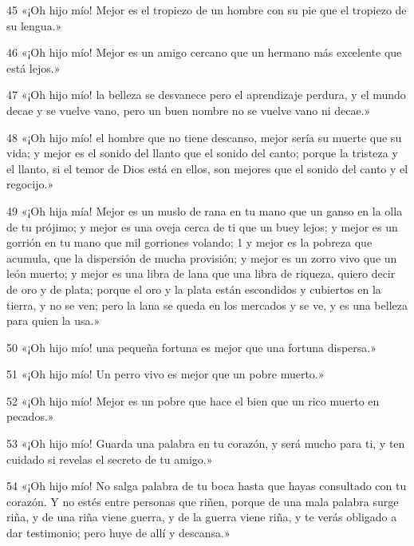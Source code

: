 \par 45 «¡Oh hijo mío! Mejor es el tropiezo de un hombre con su pie que el tropiezo de su lengua.»

\par 46 «¡Oh hijo mío! Mejor es un amigo cercano que un hermano más excelente que está lejos.»

\par 47 «¡Oh hijo mío! la belleza se desvanece pero el aprendizaje perdura, y el mundo decae y se vuelve vano, pero un buen nombre no se vuelve vano ni decae.»

\par 48 «¡Oh hijo mío! el hombre que no tiene descanso, mejor sería su muerte que su vida; y mejor es el sonido del llanto que el sonido del canto; porque la tristeza y el llanto, si el temor de Dios está en ellos, son mejores que el sonido del canto y el regocijo.»

\par 49 «¡Oh hija mía! Mejor es un muslo de rana en tu mano que un ganso en la olla de tu prójimo; y mejor es una oveja cerca de ti que un buey lejos; y mejor es un gorrión en tu mano que mil gorriones volando; 1 y mejor es la pobreza que acumula, que la dispersión de mucha provisión; y mejor es un zorro vivo que un león muerto; y mejor es una libra de lana que una libra de riqueza, quiero decir de oro y de plata; porque el oro y la plata están escondidos y cubiertos en la tierra, y no se ven; pero la lana se queda en los mercados y se ve, y es una belleza para quien la usa.»

\par 50 «¡Oh hijo mío! una pequeña fortuna es mejor que una fortuna dispersa.»

\par 51 «¡Oh hijo mío! Un perro vivo es mejor que un pobre muerto.»

\par 52 «¡Oh hijo mío! Mejor es un pobre que hace el bien que un rico muerto en pecados.»

\par 53 «¡Oh hijo mío! Guarda una palabra en tu corazón, y será mucho para ti, y ten cuidado si revelas el secreto de tu amigo.»

\par 54 «¡Oh hijo mío! No salga palabra de tu boca hasta que hayas consultado con tu corazón. Y no estés entre personas que riñen, porque de una mala palabra surge riña, y de una riña viene guerra, y de la guerra viene riña, y te verás obligado a dar testimonio; pero huye de allí y descansa.»


